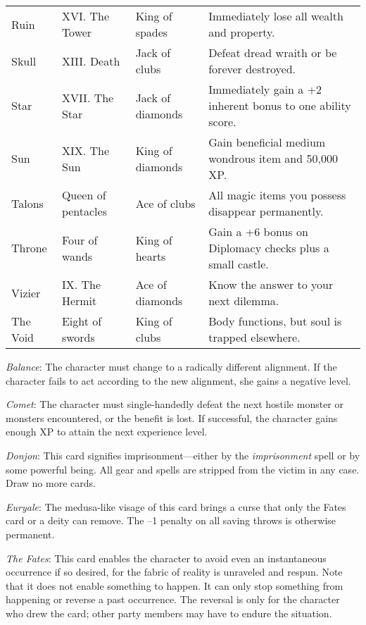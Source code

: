 \begin{figure*}[]
\begin{tabular}{llll}
Ruin            & XVI. The Tower      & King of spades            & Immediately lose all wealth and property.                  \\
Skull           & XIII. Death         & Jack of clubs             & Defeat dread wraith or be forever destroyed.               \\
Star            & XVII. The Star      & Jack of diamonds          & Immediately gain a +2 inherent bonus to one ability score. \\
Sun             & XIX. The Sun        & King of diamonds          & Gain beneficial medium wondrous item and 50,000 XP.        \\
Talons          & Queen of pentacles  & Ace of clubs              & All magic items you possess disappear permanently.         \\
Throne          & Four of wands       & King of hearts            & Gain a +6 bonus on Diplomacy checks plus a small castle.   \\
Vizier          & IX. The Hermit      & Ace of diamonds           & Know the answer to your next dilemma.                      \\
The Void        & Eight of swords     & King of clubs             & Body functions, but soul is trapped elsewhere.            
\end{tabular}
\end{figure*}

\textit{Balance}: The character must change to a radically different alignment. If the character fails to act according to the new alignment, she gains a negative level.
				
\textit{Comet}: The character must single-handedly defeat the next hostile monster or monsters encountered, or the benefit is lost. If successful, the character gains enough XP to attain the next experience level.
				
\textit{Donjon}: This card signifies imprisonment---either by the \textit{imprisonment }spell or by some powerful being. All gear and spells are stripped from the victim in any case. Draw no more cards.
				
\textit{Euryale}: The medusa-like visage of this card brings a curse that only the Fates card or a deity can remove. The --1 penalty on all saving throws is otherwise permanent.
				
\textit{The Fates}: This card enables the character to avoid even an instantaneous occurrence if so desired, for the fabric of reality is unraveled and respun. Note that it does not enable something to happen. It can only stop something from happening or reverse a past occurrence. The reversal is only for the character who drew the card; other party members may have to endure the situation.
				

